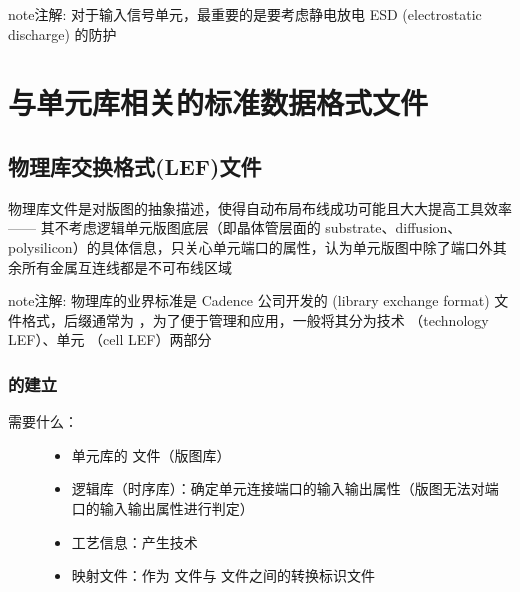 \documentclass[letterpaper,10pt,english]{sphinxmanual}
\begin{document}
\begin{sphinxadmonition}{note}{注解:}
\sphinxAtStartPar
对于输入信号单元，最重要的是要考虑静电放电 ESD (electrostatic discharge) 的防护
\end{sphinxadmonition}


\section{与单元库相关的标准数据格式文件}
\label{\detokenize{chapter2/_u5355_u5143_u5e93_u76f8_u5173_u7684_u6807_u51c6_u6570_u636e_u683c_u5f0f_u6587_u4ef6:id1}}\label{\detokenize{chapter2/_u5355_u5143_u5e93_u76f8_u5173_u7684_u6807_u51c6_u6570_u636e_u683c_u5f0f_u6587_u4ef6::doc}}

\subsection{物理库交换格式(LEF)文件}
\label{\detokenize{chapter2/_u7269_u7406_u5e93_u4ea4_u6362_u683c_u5f0f(LEF)_u6587_u4ef6:lef}}\label{\detokenize{chapter2/_u7269_u7406_u5e93_u4ea4_u6362_u683c_u5f0f(LEF)_u6587_u4ef6::doc}}
\sphinxAtStartPar
物理库文件是对版图的抽象描述，使得自动布局布线成功可能且大大提高工具效率 —— 其不考虑逻辑单元版图底层（即晶体管层面的 substrate、diffusion、polysilicon）的具体信息，只关心单元端口的属性，认为单元版图中除了端口外其余所有金属互连线都是不可布线区域

\begin{sphinxadmonition}{note}{注解:}
\sphinxAtStartPar
物理库的业界标准是 Cadence 公司开发的  (library exchange format) 文件格式，后缀通常为  ，为了便于管理和应用，一般将其分为技术  （technology LEF）、单元  （cell LEF）两部分
\end{sphinxadmonition}


\subsubsection{ 的建立}
\label{\detokenize{chapter2/_u7269_u7406_u5e93_u4ea4_u6362_u683c_u5f0f(LEF)_u6587_u4ef6:id1}}\begin{description}
\item[{需要什么：}] \leavevmode\begin{itemize}
\item {} 
\sphinxAtStartPar
单元库的  文件（版图库）

\item {} 
\sphinxAtStartPar
逻辑库（时序库）：确定单元连接端口的输入输出属性（版图无法对端口的输入输出属性进行判定）

\item {} 
\sphinxAtStartPar
工艺信息：产生技术 

\item {} 
\sphinxAtStartPar
映射文件：作为  文件与  文件之间的转换标识文件

\end{itemize}

\end{description}
\end{document}

